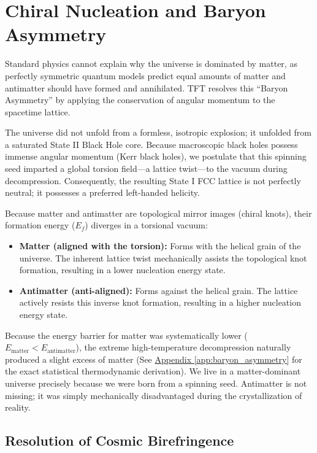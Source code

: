 \section{Chiral Nucleation and Baryon Asymmetry}
Standard physics cannot explain why the universe is dominated by matter, as perfectly symmetric quantum models predict equal amounts of matter and antimatter should have formed and annihilated. TFT resolves this ``Baryon Asymmetry'' by applying the conservation of angular momentum to the spacetime lattice.

The universe did not unfold from a formless, isotropic explosion; it unfolded from a saturated State II Black Hole core. Because macroscopic black holes possess immense angular momentum (Kerr black holes), we postulate that this spinning seed imparted a global torsion field---a lattice twist---to the vacuum during decompression. Consequently, the resulting State I FCC lattice is not perfectly neutral; it possesses a preferred left-handed helicity.

Because matter and antimatter are topological mirror images (chiral knots), their formation energy ($E_f$) diverges in a torsional vacuum:
\begin{itemize}
    \item \textbf{Matter (aligned with the torsion):} Forms with the helical grain of the universe. The inherent lattice twist mechanically assists the topological knot formation, resulting in a lower nucleation energy state.
    \item \textbf{Antimatter (anti-aligned):} Forms against the helical grain. The lattice actively resists this inverse knot formation, resulting in a higher nucleation energy state.
\end{itemize}

Because the energy barrier for matter was systematically lower ($E_{\text{matter}} < E_{\text{antimatter}}$), the extreme high-temperature decompression naturally produced a slight excess of matter (See \hyperref[app:baryon_asymmetry]{Appendix \ref*{app:baryon_asymmetry}} for the exact statistical thermodynamic derivation). We live in a matter-dominant universe precisely because we were born from a spinning seed. Antimatter is not missing; it was simply mechanically disadvantaged during the crystallization of reality.

\subsection{Resolution of Cosmic Birefringence}
\label{sec:resolution_cosmic_birefringence}


